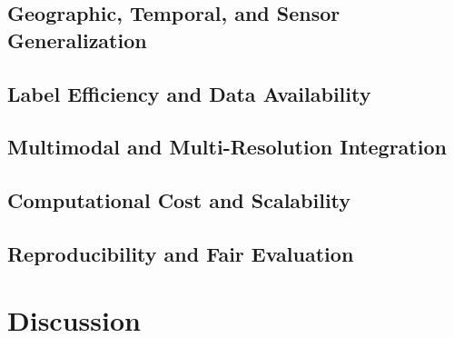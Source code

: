 \documentclass[11pt,a4paper]{article}
\begin{document}
\subsection{Geographic, Temporal, and Sensor Generalization}


\subsection{Label Efficiency and Data Availability}


\subsection{Multimodal and Multi-Resolution Integration}


\subsection{Computational Cost and Scalability}


\subsection{Reproducibility and Fair Evaluation}


\section{Discussion}
\end{document}
